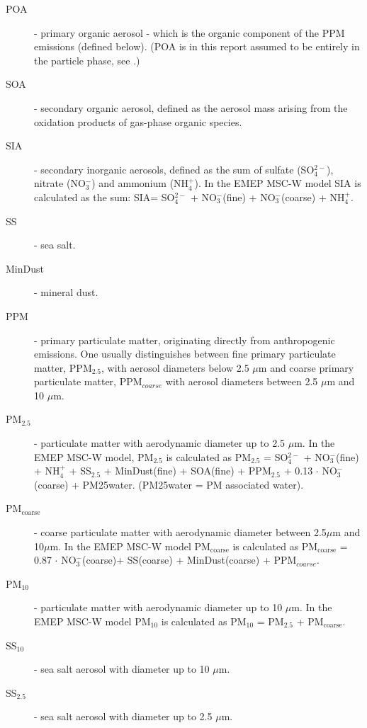 \begin{description}

\item[POA] - primary organic aerosol - which is the organic component of
the PPM emissions (defined below). (POA is in this report assumed to
be entirely in the particle phase, see \citet{R2020:SVOC}.)
  
\item[SOA] - secondary organic aerosol, defined as the aerosol mass
  arising from the oxidation products of gas-phase organic species.

\item[SIA]- secondary inorganic aerosols, defined as the sum of
  sulfate (SO$^{2-}_4$), nitrate (NO$^-_3$) and ammonium (NH$^+_4$).
  In the EMEP MSC-W model SIA is calculated as the sum: SIA= SO$^{2-}_4$
  + NO$^-_3$(fine) + NO$^-_3$(coarse) + NH$^+_4$.

\item[SS] - sea salt.

\item[MinDust] - mineral dust.

\item[PPM] - primary particulate matter, originating directly from
  anthropogenic emissions. One usually distinguishes between fine
  primary particulate matter, PPM$_{2.5}$, with aerosol diameters
  below 2.5 $\mu$m and coarse primary particulate matter, PPM$_{coarse}$
  with aerosol diameters between 2.5 $\mu$m and 10 $\mu$m.

\item[PM$_{2.5}$] - particulate matter with aerodynamic diameter
  up to 2.5 $\mu$m. In the EMEP
  MSC-W model, PM$_{2.5}$ is calculated as PM$_{2.5}$ = SO$^{2-}_4$
  + NO$^-_3$(fine) + NH$^+_4$ + SS$_{2.5}$ + MinDust(fine)
  + SOA(fine) + PPM$_{2.5}$ + 0.13 $\cdot$ NO$^-_3$(coarse) + PM25water.
  (PM25water = PM associated water).

\item[PM$_{\text{coarse}}$] - coarse particulate matter with aerodynamic
  diameter between 2.5$\mu$m 
  and 10$\mu$m. In the EMEP MSC-W model PM$_{\text{coarse}}$ is calculated
  as PM$_{\text{coarse}}$ = 0.87 $\cdot$ NO$^-_3$(coarse)+ SS(coarse)
  + MinDust(coarse) + PPM$_{coarse}$.

\item[PM$_{10}$] - particulate matter with aerodynamic diameter
  up to 10 $\mu$m. In the EMEP
   MSC-W model PM$_{10}$ is calculated as PM$_{10}$ = PM$_{2.5}$
  + PM$_{\text{coarse}}$.

\item[SS$_{10}$]  - sea salt aerosol with diameter
  up to 10 $\mu$m.
  
\item[SS$_{2.5}$]  - sea salt aerosol with diameter
  up to 2.5 $\mu$m.

\end{description}

